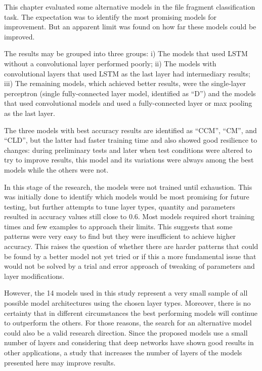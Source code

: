 This chapter evaluated some alternative models in the file fragment classification task. The expectation was to identify the most promising models for improvement. But an apparent limit was found on how far these models could be improved.

The results may be grouped into three groups: i) The models that used LSTM without a convolutional layer performed poorly; ii) The models with convolutional layers that used LSTM as the last layer had intermediary results; iii) The remaining models, which achieved better results, were the single-layer perceptron (single fully-connected layer model, identified as ``D'') and the models that used convolutional models and used a fully-connected layer or max pooling as the last layer.

The three models with best accuracy results are identified as ``CCM'', ``CM'', and ``CLD'', but the latter had faster training time and also showed good resilience to changes: during preliminary tests and later when test conditions were altered to try to improve results, this model and its variations were always among the best models while the others were not.

In this stage of the research, the models were not trained until exhaustion.
This was initially done to identify which models would be most promising for future testing, but further attempts to tune layer types, quantity and parameters resulted in accuracy values still close to 0.6.
Most models required short training times and few examples to approach their limits.
This suggests that some patterns were very easy to find but they were insufficient to achieve higher accuracy.
This raises the question of whether there are harder patterns that could be found by a better model not yet tried or if this a more fundamental issue that would not be solved by a trial and error approach of tweaking of parameters and layer modifications.


However, the 14 models used in this study represent a very small sample of all possible model architectures using the chosen layer types. Moreover, there is no certainty that in different circumstances the best performing models will continue to outperform the others. For those reasons, the search for an alternative model could also be a valid research direction. Since the proposed models use a small number of layers and considering that deep networks have shown good results in other applications, a study that increases the number of layers of the models presented here may improve results.

